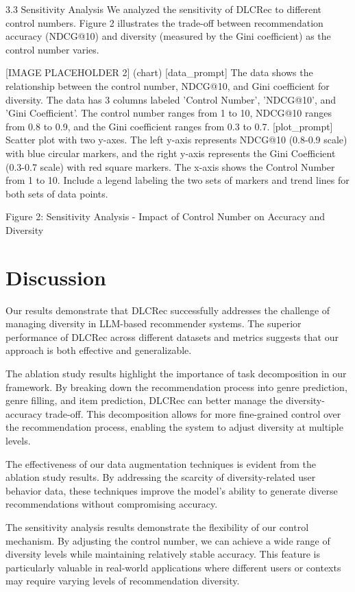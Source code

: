\documentclass[12pt,letterpaper]{article}
\begin{document}
3.3 Sensitivity Analysis
We analyzed the sensitivity of DLCRec to different control numbers. Figure 2 illustrates the trade-off between recommendation accuracy (NDCG@10) and diversity (measured by the Gini coefficient) as the control number varies.

[IMAGE PLACEHOLDER 2] (chart)
[data_prompt] The data shows the relationship between the control number, NDCG@10, and Gini coefficient for diversity. The data has 3 columns labeled 'Control Number', 'NDCG@10', and 'Gini Coefficient'. The control number ranges from 1 to 10, NDCG@10 ranges from 0.8 to 0.9, and the Gini coefficient ranges from 0.3 to 0.7.
[plot_prompt] Scatter plot with two y-axes. The left y-axis represents NDCG@10 (0.8-0.9 scale) with blue circular markers, and the right y-axis represents the Gini Coefficient (0.3-0.7 scale) with red square markers. The x-axis shows the Control Number from 1 to 10. Include a legend labeling the two sets of markers and trend lines for both sets of data points.

Figure 2: Sensitivity Analysis - Impact of Control Number on Accuracy and Diversity

\section{Discussion}

Our results demonstrate that DLCRec successfully addresses the challenge of managing diversity in LLM-based recommender systems. The superior performance of DLCRec across different datasets and metrics suggests that our approach is both effective and generalizable.

The ablation study results highlight the importance of task decomposition in our framework. By breaking down the recommendation process into genre prediction, genre filling, and item prediction, DLCRec can better manage the diversity-accuracy trade-off. This decomposition allows for more fine-grained control over the recommendation process, enabling the system to adjust diversity at multiple levels.

The effectiveness of our data augmentation techniques is evident from the ablation study results. By addressing the scarcity of diversity-related user behavior data, these techniques improve the model's ability to generate diverse recommendations without compromising accuracy.

The sensitivity analysis results demonstrate the flexibility of our control mechanism. By adjusting the control number, we can achieve a wide range of diversity levels while maintaining relatively stable accuracy. This feature is particularly valuable in real-world applications where different users or contexts may require varying levels of recommendation diversity.
\end{document}
